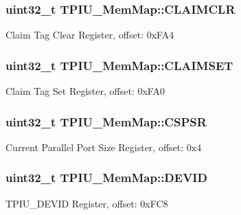 \subsubsection[{C\+L\+A\+I\+M\+C\+L\+R}]{\setlength{\rightskip}{0pt plus 5cm}uint32\+\_\+t T\+P\+I\+U\+\_\+\+Mem\+Map\+::\+C\+L\+A\+I\+M\+C\+L\+R}\label{struct_t_p_i_u___mem_map_a01f1e255c3a45165fab0992c2db91029}
Claim Tag Clear Register, offset\+: 0x\+F\+A4 \hypertarget{struct_t_p_i_u___mem_map_a70bd66aa2144dae3d99cda444fe4110d}{}
\subsubsection[{C\+L\+A\+I\+M\+S\+E\+T}]{\setlength{\rightskip}{0pt plus 5cm}uint32\+\_\+t T\+P\+I\+U\+\_\+\+Mem\+Map\+::\+C\+L\+A\+I\+M\+S\+E\+T}\label{struct_t_p_i_u___mem_map_a70bd66aa2144dae3d99cda444fe4110d}
Claim Tag Set Register, offset\+: 0x\+F\+A0 \hypertarget{struct_t_p_i_u___mem_map_a9f8c3b9dcdcb9d2677b661fe2f8a5489}{}
\subsubsection[{C\+S\+P\+S\+R}]{\setlength{\rightskip}{0pt plus 5cm}uint32\+\_\+t T\+P\+I\+U\+\_\+\+Mem\+Map\+::\+C\+S\+P\+S\+R}\label{struct_t_p_i_u___mem_map_a9f8c3b9dcdcb9d2677b661fe2f8a5489}
Current Parallel Port Size Register, offset\+: 0x4 \hypertarget{struct_t_p_i_u___mem_map_a31752201ff5297f2a82d228387b252c1}{}
\subsubsection[{D\+E\+V\+I\+D}]{\setlength{\rightskip}{0pt plus 5cm}uint32\+\_\+t T\+P\+I\+U\+\_\+\+Mem\+Map\+::\+D\+E\+V\+I\+D}\label{struct_t_p_i_u___mem_map_a31752201ff5297f2a82d228387b252c1}
T\+P\+I\+U\+\_\+\+D\+E\+V\+I\+D Register, offset\+: 0x\+F\+C8 \hypertarget{struct_t_p_i_u___mem_map_a34d81bddad51a7dcdbf76548b3809d82}{}
